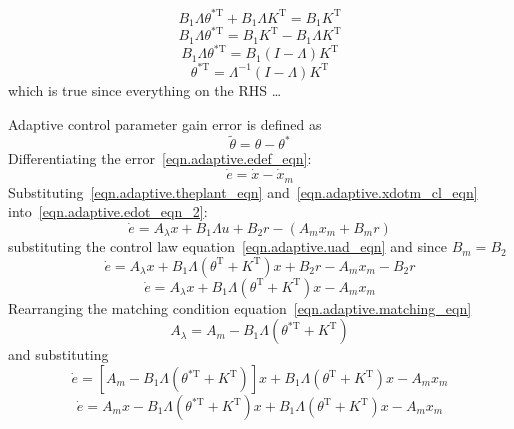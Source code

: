\begin{equation*}
  B_{1}\Lambda\theta^{*\text{T}}+B_{1}\Lambda K^{\text{T}}=B_{1}K^{\text{T}}
\end{equation*}
\begin{equation*}
  B_{1}\Lambda\theta^{*\text{T}}=B_{1}K^{\text{T}}-B_{1}\Lambda K^{\text{T}}
\end{equation*}
\begin{equation*}
  B_{1}\Lambda\theta^{*\text{T}}=B_{1}(I-\Lambda)K^{\text{T}}
\end{equation*}
\begin{equation*}
  \theta^{*\text{T}}={\Lambda}^{-1}(I-\Lambda)K^{\text{T}}
\end{equation*}
which is true since everything on the RHS \dots

Adaptive control parameter gain error is defined as
\begin{equation*}
  \tilde{\theta}=\theta-\theta^{*}
\end{equation*}
Differentiating the error~\eqref{eqn.adaptive.edef_eqn}:
\begin{equation}\label{eqn.adaptive.edot_eqn_2}
  \dot{e}=\dot{x}-\dot{x}_{m}
\end{equation}
Substituting~\eqref{eqn.adaptive.theplant_eqn} and~\eqref{eqn.adaptive.xdotm_cl_eqn} into~\eqref{eqn.adaptive.edot_eqn_2}:
\begin{equation*}
  \dot{e}=A_{\lambda}x+B_{1}\Lambda u+B_{2}r-(A_{m}x_{m}+B_{m}r)
\end{equation*}
substituting the control law equation~\eqref{eqn.adaptive.uad_eqn} and since $B_{m}=B_{2}$
\begin{equation*}
  \dot{e}=A_{\lambda}x+B_{1}\Lambda (\theta^{\text{T}}+K^{\text{T}})x+B_{2}r-A_{m}x_{m}-B_{2}r
\end{equation*}
\begin{equation*}
  \dot{e}=A_{\lambda}x+B_{1}\Lambda (\theta^{\text{T}}+K^{\text{T}})x-A_{m}x_{m}
\end{equation*}
Rearranging the matching condition equation~\eqref{eqn.adaptive.matching_eqn}
\begin{equation*}
  A_{\lambda}=A_{m}-B_{1}\Lambda(\theta^{*\text{T}}+K^{\text{T}})
\end{equation*}
and substituting
\begin{equation*}
  \dot{e}=[A_{m}-B_{1}\Lambda(\theta^{*\text{T}}+K^{\text{T}})]x+B_{1}\Lambda (\theta^{\text{T}}+K^{\text{T}})x-A_{m}x_{m}
\end{equation*}
\begin{equation*}
  \dot{e}=A_{m}x-B_{1}\Lambda(\theta^{*\text{T}}+K^{\text{T}})x+B_{1}\Lambda (\theta^{\text{T}}+K^{\text{T}})x-A_{m}x_{m}
\end{equation*}
